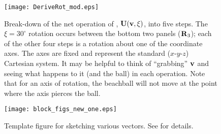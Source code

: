 \documentclass[11pt,titlepage,fleqn]{article}
\newcommand{\rotangB}{\xi}    %
\newcommand{\rotvec}{\bv}      %
\begin{document}
\clearpage\pagebreak
\begin{figure}
\centering
\texttt{[image: DeriveRot\_mod.eps]}
\caption[]
{{
Break-down of the net operation of , $\bU(\rotvec,\rotangB)$, into five steps.
The $\rotangB = 30^\circ$ rotation occurs between the bottom two panels ($\mbox{${\bf R}$}_3$); each of the other four steps is a rotation about one of the coordinate axes. The axes are fixed and represent the standard ($x$-$y$-$z$) Cartesian system. It may be helpful to think of ``grabbing'' $\rotvec$ and seeing what happens to it (and the ball) in each operation. Note that for an axis of rotation, the beachball will not move at the point where the axis pierces the ball.
\label{fig:rot}
}}
\end{figure}

\clearpage\pagebreak


\begin{figure}
\centering
\texttt{[image: block\_figs\_new\_one.eps]}
\caption[]
{{
Template figure for sketching various vectors.
See  for details.
\label{fig:block}
}}
\end{figure}

\end{document}
